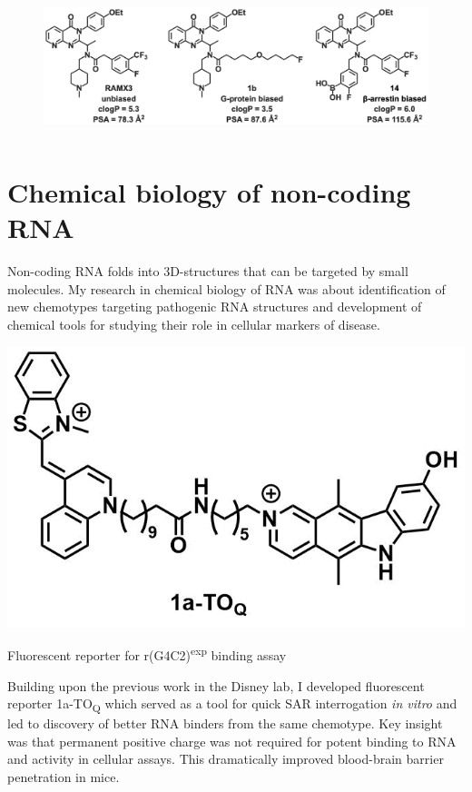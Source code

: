\documentclass{tufte-handout}
\begin{document}
\newpage
\begin{fullwidth}
\centering
\begin{figure}
	\includegraphics[height = 40mm]{cxcr3-allosteric-ligands.png}
	\label{fig:cxcr3}
\end{figure}
\end{fullwidth}


\section{Chemical biology of non-coding RNA}
Non-coding RNA folds into 3D-structures that can be targeted by small molecules.\cite{Bernat2015b}
My research in chemical biology of RNA was about identification of new chemotypes targeting
pathogenic RNA structures and development of chemical tools for studying their role in
cellular markers of disease.
\begin{marginfigure}\label{fig:1a-TOq}
	\includegraphics{1a-TOq.png}
	\caption{Fluorescent reporter for r(G4C2)\textsuperscript{exp} binding assay}
\end{marginfigure}
 Building upon the previous work in the Disney lab, I developed fluorescent reporter 1a-TO\textsubscript{Q} which served as a tool for quick SAR interrogation \textit{in vitro} and led to discovery of better RNA binders from the same chemotype\cite{Wang2019}. Key insight was that permanent positive charge was not required for potent binding to RNA and activity in cellular assays. This dramatically improved blood-brain barrier penetration in mice.
\end{document}
